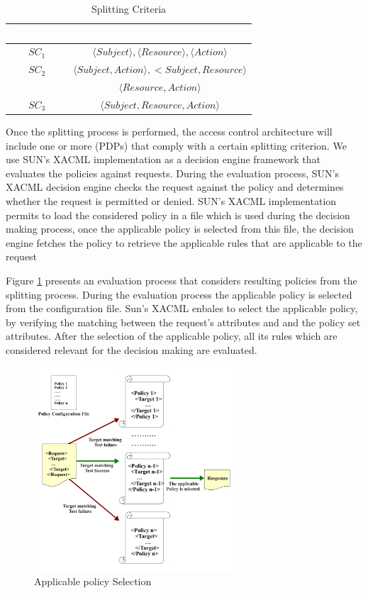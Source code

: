 \begin{table}[h!]
\centering
\setlength{\extrarowheight}{6 pt}
\begin{tabular}{|>{\small}c|>{\small}c|} 
\hline  \rowcolor{black} 
\bf
\textcolor{white}{Categories}& \bf \textcolor{white}{Splitting Criteria}\\ \hline
$SC_{1}$& {$\langle Subject \rangle, \langle Resource\rangle, \langle Action\rangle$}\\ \hline
$SC_{2}$& {$\langle Subject,Action \rangle, <Subject,Resource\rangle$}\\&{$\langle Resource,Action\rangle$}\\  \hline
$SC_{3}$& {$\langle Subject,Resource,Action\rangle$}\\ \hline
\end{tabular}
\caption{Splitting Criteria}
\label{table1}\end{table}


Once the splitting process is performed, the access control architecture will include one or more (PDPs) that comply with a certain splitting criterion.
We use SUN's XACML implementation \cite{sunxacml} as a decision engine framework that evaluates the policies against requests.
During the evaluation process, SUN's XACML decision engine checks the request against the policy and determines whether the request is 
permitted or denied. SUN's XACML implementation permits to load the considered policy in a file which is used during the decision making process, once the applicable policy 
is selected from this file, the decision engine fetches the policy to retrieve the applicable rules that are applicable to the request


Figure \ref{requestevaluation} presents an evaluation process that considers resulting policies from the splitting process. 
During the evaluation process the applicable 
policy is selected from the configuration file. Sun's XACML enbales to select the applicable policy, by verifying the matching between the request's attributes
 and and the policy set attributes. 
After the selection of the applicable policy, all its rules which are considered relevant for the decision making are evaluated.

\begin{figure}[!h]
\begin{center}
\includegraphics[width=3in, height=3in]{requestevaluation}
\caption{Applicable policy Selection}
\label{requestevaluation}
\end{center}
\end{figure}


